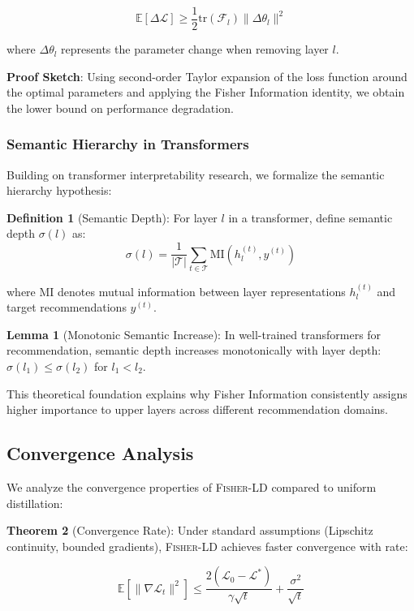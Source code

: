 \documentclass[10pt,conference]{IEEEtran}
\newcommand{\fisher}{\mathcal{F}}
\newcommand{\loss}{\mathcal{L}}
\newcommand{\fisherld}{\textsc{Fisher-LD}}
\begin{document}
\begin{equation}
\mathbb{E}[\Delta \loss] \geq \frac{1}{2} \text{tr}(\fisher_l) \|\Delta \theta_l\|^2
\end{equation}

where $\Delta \theta_l$ represents the parameter change when removing layer $l$.

\textbf{Proof Sketch}: Using second-order Taylor expansion of the loss function around the optimal parameters and applying the Fisher Information identity, we obtain the lower bound on performance degradation.

\subsubsection{Semantic Hierarchy in Transformers}

Building on transformer interpretability research, we formalize the semantic hierarchy hypothesis:

\textbf{Definition 1} (Semantic Depth): For layer $l$ in a transformer, define semantic depth $\sigma(l)$ as:
\begin{equation}
\sigma(l) = \frac{1}{|\mathcal{T}|} \sum_{t \in \mathcal{T}} \text{MI}(h_l^{(t)}, y^{(t)})
\end{equation}

where $\text{MI}$ denotes mutual information between layer representations $h_l^{(t)}$ and target recommendations $y^{(t)}$.

\textbf{Lemma 1} (Monotonic Semantic Increase): In well-trained transformers for recommendation, semantic depth increases monotonically with layer depth: $\sigma(l_1) \leq \sigma(l_2)$ for $l_1 < l_2$.

This theoretical foundation explains why Fisher Information consistently assigns higher importance to upper layers across different recommendation domains.

\subsection{Convergence Analysis}

We analyze the convergence properties of \fisherld{} compared to uniform distillation:

\textbf{Theorem 2} (Convergence Rate): Under standard assumptions (Lipschitz continuity, bounded gradients), \fisherld{} achieves faster convergence with rate:

\begin{equation}
\mathbb{E}[\|\nabla \loss_t\|^2] \leq \frac{2(\loss_0 - \loss^*)}{\gamma \sqrt{t}} + \frac{\sigma^2}{\sqrt{t}}
\end{equation}
\end{document}
